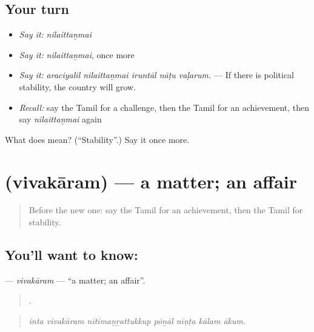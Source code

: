 \subsection*{Your turn}
\begin{itemize}
\raggedright
  \item \emph{Say it:} \emph{nilaittaṉmai}
  \item \emph{Say it:} \emph{nilaittaṉmai}, once more
  \item \emph{Say it:} \emph{araciyalil nilaittaṉmai iruntāl nāṭu vaḷarum.} — If there is political stability, the country will grow.
  \item \emph{Recall:} say the Tamil for a challenge, then the Tamil for an achievement, then say \emph{nilaittaṉmai} again
\end{itemize}

\begin{tcolorbox}[breakable,colback=teal!4,colframe=teal!35!black,title={Before you move on}]
What does  mean? (\textquotedblleft{}Stability\textquotedblright{}.) Say it once more.
\end{tcolorbox}
\section[\texorpdfstring{\ta{விவகாரம்} (vivakāram)}{விவகாரம் (vivakāram)}]{ (vivakāram) — a matter; an affair}

\label{lesson:TA-C398-vivakaram}



\begin{quote}
Before the new one: say the Tamil for an achievement, then the Tamil for stability.
\end{quote}

\subsection*{You'll want to know: }
\textbf{} — \emph{vivakāram} — \textquotedblleft{}a matter; an affair\textquotedblright{}.

\begin{quote}
      .
\end{quote}

\begin{quote}
\emph{inta vivakāram nītimaṉṟattukkup pōṉāl nīṇṭa kālam ākum.}
\end{quote}

